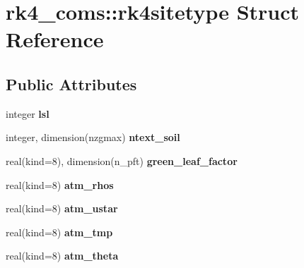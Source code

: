 \hypertarget{structrk4__coms_1_1rk4sitetype}{
\section{rk4\_\-coms::rk4sitetype Struct Reference}
\label{structrk4__coms_1_1rk4sitetype}
}
\subsection*{Public Attributes}
\begin{DoxyCompactItemize}
\item 
\hypertarget{structrk4__coms_1_1rk4sitetype_ac4eedc16dd114a614202278468361154}{
integer {\bfseries lsl}}
\label{structrk4__coms_1_1rk4sitetype_ac4eedc16dd114a614202278468361154}

\item 
\hypertarget{structrk4__coms_1_1rk4sitetype_ad9312ab9ffa2058d7d38b57e69d64788}{
integer, dimension(nzgmax) {\bfseries ntext\_\-soil}}
\label{structrk4__coms_1_1rk4sitetype_ad9312ab9ffa2058d7d38b57e69d64788}

\item 
\hypertarget{structrk4__coms_1_1rk4sitetype_ab0cabdca78acc08626e24dee21737686}{
real(kind=8), dimension(n\_\-pft) {\bfseries green\_\-leaf\_\-factor}}
\label{structrk4__coms_1_1rk4sitetype_ab0cabdca78acc08626e24dee21737686}

\item 
\hypertarget{structrk4__coms_1_1rk4sitetype_a5ee30feb961affb97521718f4b02b6cc}{
real(kind=8) {\bfseries atm\_\-rhos}}
\label{structrk4__coms_1_1rk4sitetype_a5ee30feb961affb97521718f4b02b6cc}

\item 
\hypertarget{structrk4__coms_1_1rk4sitetype_a2e45ed4abff0bddac0e01799f5383201}{
real(kind=8) {\bfseries atm\_\-ustar}}
\label{structrk4__coms_1_1rk4sitetype_a2e45ed4abff0bddac0e01799f5383201}

\item 
\hypertarget{structrk4__coms_1_1rk4sitetype_a1fd547fce62b744e2b9be149aa91f7fd}{
real(kind=8) {\bfseries atm\_\-tmp}}
\label{structrk4__coms_1_1rk4sitetype_a1fd547fce62b744e2b9be149aa91f7fd}

\item 
\hypertarget{structrk4__coms_1_1rk4sitetype_a3bb57b681c3a3fd9c968943550cfc726}{
real(kind=8) {\bfseries atm\_\-theta}}
\label{structrk4__coms_1_1rk4sitetype_a3bb57b681c3a3fd9c968943550cfc726}


\end{DoxyCompactItemize}
